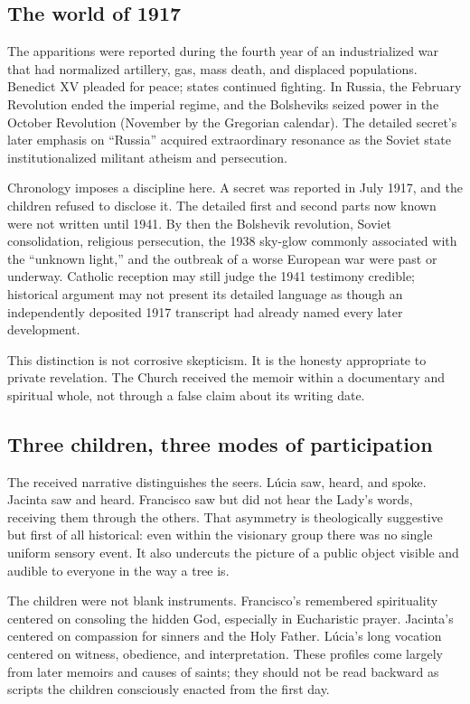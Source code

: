 \subsection{The world of 1917}

The apparitions were reported during the fourth year of an industrialized war that had normalized artillery, gas, mass death, and displaced populations. Benedict XV pleaded for peace; states continued fighting. In Russia, the February Revolution ended the imperial regime, and the Bolsheviks seized power in the October Revolution (November by the Gregorian calendar). The detailed secret's later emphasis on “Russia” acquired extraordinary resonance as the Soviet state institutionalized militant atheism and persecution.

Chronology imposes a discipline here. A secret was reported in July 1917, and the children refused to disclose it. The detailed first and second parts now known were not written until 1941. By then the Bolshevik revolution, Soviet consolidation, religious persecution, the 1938 sky-glow commonly associated with the “unknown light,” and the outbreak of a worse European war were past or underway. Catholic reception may still judge the 1941 testimony credible; historical argument may not present its detailed language as though an independently deposited 1917 transcript had already named every later development.

This distinction is not corrosive skepticism. It is the honesty appropriate to private revelation. The Church received the memoir within a documentary and spiritual whole, not through a false claim about its writing date.

\subsection{Three children, three modes of participation}

The received narrative distinguishes the seers. Lúcia saw, heard, and spoke. Jacinta saw and heard. Francisco saw but did not hear the Lady's words, receiving them through the others. That asymmetry is theologically suggestive but first of all historical: even within the visionary group there was no single uniform sensory event. It also undercuts the picture of a public object visible and audible to everyone in the way a tree is.

The children were not blank instruments. Francisco's remembered spirituality centered on consoling the hidden God, especially in Eucharistic prayer. Jacinta's centered on compassion for sinners and the Holy Father. Lúcia's long vocation centered on witness, obedience, and interpretation. These profiles come largely from later memoirs and causes of saints; they should not be read backward as scripts the children consciously enacted from the first day.

